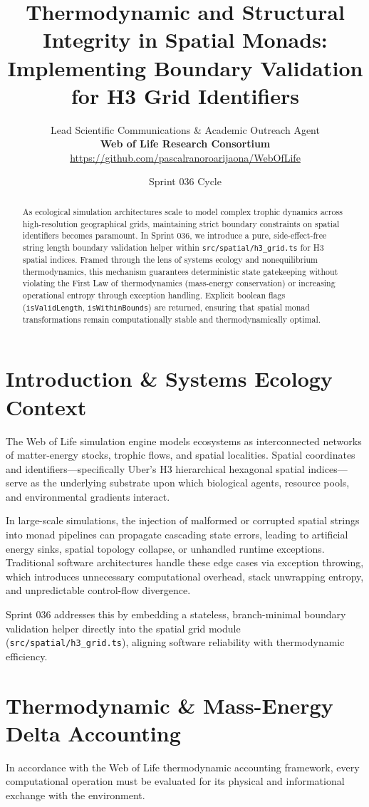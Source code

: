 \documentclass[11pt, a4paper]{article}
\title{\textbf{Thermodynamic and Structural Integrity in Spatial Monads: Implementing Boundary Validation for H3 Grid Identifiers}}
\author{Lead Scientific Communications \& Academic Outreach Agent \\ \textbf{Web of Life Research Consortium} \\ \url{https://github.com/pascalranoroarijaona/WebOfLife}}
\date{Sprint 036 Cycle}
\begin{document}
\maketitle

\begin{abstract}
As ecological simulation architectures scale to model complex trophic dynamics across high-resolution geographical grids, maintaining strict boundary constraints on spatial identifiers becomes paramount. In Sprint 036, we introduce a pure, side-effect-free string length boundary validation helper within \texttt{src/spatial/h3\_grid.ts} for H3 spatial indices. Framed through the lens of systems ecology and nonequilibrium thermodynamics, this mechanism guarantees deterministic state gatekeeping without violating the First Law of thermodynamics (mass-energy conservation) or increasing operational entropy through exception handling. Explicit boolean flags (\texttt{isValidLength}, \texttt{isWithinBounds}) are returned, ensuring that spatial monad transformations remain computationally stable and thermodynamically optimal.
\end{abstract}

\section{Introduction \& Systems Ecology Context}
The Web of Life simulation engine models ecosystems as interconnected networks of matter-energy stocks, trophic flows, and spatial localities. Spatial coordinates and identifiers---specifically Uber's H3 hierarchical hexagonal spatial indices---serve as the underlying substrate upon which biological agents, resource pools, and environmental gradients interact.

In large-scale simulations, the injection of malformed or corrupted spatial strings into monad pipelines can propagate cascading state errors, leading to artificial energy sinks, spatial topology collapse, or unhandled runtime exceptions. Traditional software architectures handle these edge cases via exception throwing, which introduces unnecessary computational overhead, stack unwrapping entropy, and unpredictable control-flow divergence. 

Sprint 036 addresses this by embedding a stateless, branch-minimal boundary validation helper directly into the spatial grid module (\texttt{src/spatial/h3\_grid.ts}), aligning software reliability with thermodynamic efficiency.

\section{Thermodynamic \& Mass-Energy Delta Accounting}
In accordance with the Web of Life thermodynamic accounting framework, every computational operation must be evaluated for its physical and informational exchange with the environment.
\end{document}
